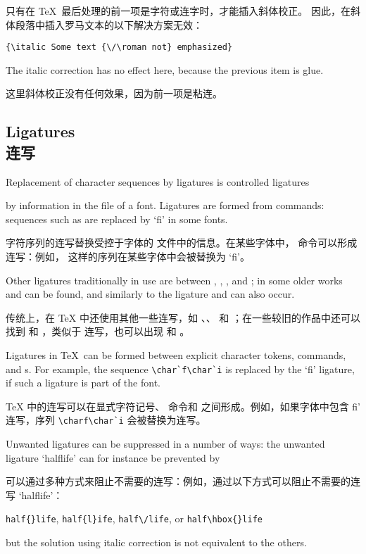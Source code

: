 只有在 \TeX\ 最后处理的前一项是字符或连字时，才能插入斜体校正。
因此，在斜体段落中插入罗马文本的以下解决方案无效：
\begin{verbatim}
{\italic Some text {\/\roman not} emphasized}
\end{verbatim}
The italic correction has no effect here,
because the previous item is glue.

这里斜体校正没有任何效果，因为前一项是粘连。


\subsection{Ligatures\\连写}

Replacement of character sequences by ligatures is controlled
\term ligatures\par
by information in the  file of a font.
Ligatures are formed from  commands:
sequences such as  are replaced by `fi' in some fonts.

字符序列的连写替换受控于字体的  文件中的信息。在某些字体中， 命令可以形成连写：例如， 这样的序列在某些字体中会被替换为 `fi'。

Other ligatures traditionally in use are
between , , , and ;
in some older works  and  can be found,
and similarly to the  ligature  and 
can also occur.

传统上，在 \TeX{} 中还使用其他一些连写，如 、、 和 ；在一些较旧的作品中还可以找到  和 ，类似于  连写，也可以出现  和 。

Ligatures in \TeX\ can be formed between explicit character
tokens,  commands, and s.
For example,
the sequence \verb-\char`f\char`i- is replaced by the
`fi' ligature, if such a ligature is part of the font.

\TeX{} 中的连写可以在显式字符记号、 命令和  之间形成。例如，如果字体中包含 fi' 连写，序列 \verb-\charf\char`i- 会被替换为连写。


Unwanted ligatures can be suppressed in a number of ways:
the unwanted ligature `\hbox{halflife}' can 
for instance be prevented by

可以通过多种方式来阻止不需要的连写：例如，通过以下方式可以阻止不需要的连写 `\hbox{halflife}'：
\begin{disp} \verb>half{}life>, \verb>half{l}ife>, \verb>half\/life>,
      or \verb>half\hbox{}life>\end{disp}
but the solution using italic correction is not equivalent
to the others.

